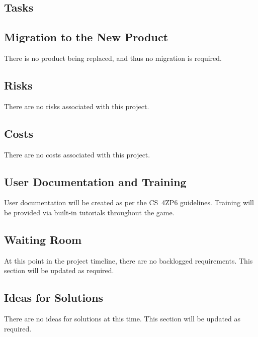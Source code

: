 \documentclass[12pt, titlepage]{article}
\begin{document}
\subsection{Tasks}

\subsection{Migration to the New Product}
There is no product being replaced, and thus no migration is required.
\subsection{Risks}
There are no risks associated with this project.
\subsection{Costs}
There are no costs associated with this project.
\subsection{User Documentation and Training}
User documentation will be created as per the CS~4ZP6 guidelines.  Training will be provided via built-in tutorials throughout the game.
\subsection{Waiting Room}
At this point in the project timeline, there are no backlogged requirements.  This section will be updated as required.
\subsection{Ideas for Solutions}
There are no ideas for solutions at this time.  This section will be updated as required.
\end{document}
